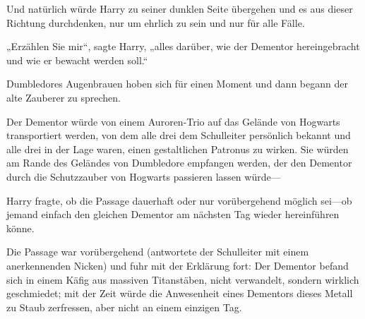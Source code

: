 Und natürlich würde Harry zu seiner dunklen Seite übergehen und es aus dieser Richtung durchdenken, nur um ehrlich zu sein und nur für alle Fälle.

„Erzählen Sie mir“, sagte Harry, „alles darüber, wie der Dementor hereingebracht und wie er bewacht werden soll.“

Dumbledores Augenbrauen hoben sich für einen Moment und dann begann der alte Zauberer zu sprechen.

Der Dementor würde von einem Auroren-Trio auf das Gelände von Hogwarts transportiert werden, von dem alle drei dem Schulleiter persönlich bekannt und alle drei in der Lage waren, einen gestaltlichen Patronus zu wirken. Sie würden am Rande des Geländes von Dumbledore empfangen werden, der den Dementor durch die Schutzzauber von Hogwarts passieren lassen würde—

Harry fragte, ob die Passage dauerhaft oder nur vorübergehend möglich sei—ob jemand einfach den gleichen Dementor am nächsten Tag wieder hereinführen könne.

Die Passage war vorübergehend (antwortete der Schulleiter mit einem anerkennenden Nicken) und fuhr mit der Erklärung fort: Der Dementor befand sich in einem Käfig aus massiven Titanstäben, nicht verwandelt, sondern wirklich geschmiedet; mit der Zeit würde die Anwesenheit eines Dementors dieses Metall zu Staub zerfressen, aber nicht an einem einzigen Tag.


